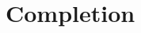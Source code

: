\documentclass[../main]{subfiles}
\begin{document}
\chapter{Completion}\label{ch:09}

\setcounter{section}{22}


\end{document}
